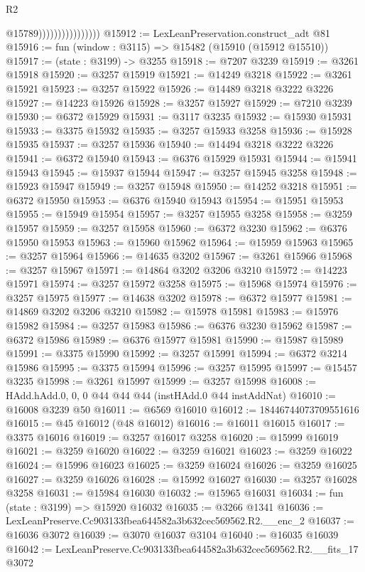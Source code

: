 \begin{lexlean}{R2}
\begin{coremodule}
                                    @15789))))))))))))))))
@15912 := LexLeanPreservation.construct_adt @81
@15916 := fun (window : @3115) => @15482 (@15910 (@15912 @15510))
@15917 := (state : @3199) -> @3255
@15918 := @7207 @3239
@15919 := @3261 @15918
@15920 := @3257 @15919
@15921 := @14249 @3218
@15922 := @3261 @15921
@15923 := @3257 @15922
@15926 := @14489 @3218 @3222 @3226
@15927 := @14223 @15926
@15928 := @3257 @15927
@15929 := @7210 @3239
@15930 := @6372 @15929
@15931 := @3117 @3235
@15932 := @15930 @15931
@15933 := @3375 @15932
@15935 := @3257 @15933 @3258
@15936 := @15928 @15935
@15937 := @3257 @15936
@15940 := @14494 @3218 @3222 @3226
@15941 := @6372 @15940
@15943 := @6376 @15929 @15931
@15944 := @15941 @15943
@15945 := @15937 @15944
@15947 := @3257 @15945 @3258
@15948 := @15923 @15947
@15949 := @3257 @15948
@15950 := @14252 @3218
@15951 := @6372 @15950
@15953 := @6376 @15940 @15943
@15954 := @15951 @15953
@15955 := @15949 @15954
@15957 := @3257 @15955 @3258
@15958 := @3259 @15957
@15959 := @3257 @15958
@15960 := @6372 @3230
@15962 := @6376 @15950 @15953
@15963 := @15960 @15962
@15964 := @15959 @15963
@15965 := @3257 @15964
@15966 := @14635 @3202
@15967 := @3261 @15966
@15968 := @3257 @15967
@15971 := @14864 @3202 @3206 @3210
@15972 := @14223 @15971
@15974 := @3257 @15972 @3258
@15975 := @15968 @15974
@15976 := @3257 @15975
@15977 := @14638 @3202
@15978 := @6372 @15977
@15981 := @14869 @3202 @3206 @3210
@15982 := @15978 @15981
@15983 := @15976 @15982
@15984 := @3257 @15983
@15986 := @6376 @3230 @15962
@15987 := @6372 @15986
@15989 := @6376 @15977 @15981
@15990 := @15987 @15989
@15991 := @3375 @15990
@15992 := @3257 @15991
@15994 := @6372 @3214 @15986
@15995 := @3375 @15994
@15996 := @3257 @15995
@15997 := @15457 @3235
@15998 := @3261 @15997
@15999 := @3257 @15998
@16008 := HAdd.hAdd.{0, 0, 0} @44 @44 @44 (instHAdd.{0} @44 instAddNat)
@16010 := @16008 @3239 @50
@16011 := @6569 @16010
@16012 := 18446744073709551616
@16015 := @45 @16012 (@48 @16012)
@16016 := @16011 @16015
@16017 := @3375 @16016
@16019 := @3257 @16017 @3258
@16020 := @15999 @16019
@16021 := @3259 @16020
@16022 := @3259 @16021
@16023 := @3259 @16022
@16024 := @15996 @16023
@16025 := @3259 @16024
@16026 := @3259 @16025
@16027 := @3259 @16026
@16028 := @15992 @16027
@16030 := @3257 @16028 @3258
@16031 := @15984 @16030
@16032 := @15965 @16031
@16034 := fun (state : @3199) => @15920 @16032
@16035 := @3266 @1341
@16036 := LexLeanPreserve.Cc903133fbea644582a3b632cec569562.R2.__enc_2
@16037 := @16036 @3072
@16039 := @3070 @16037 @3104
@16040 := @16035 @16039
@16042 := LexLeanPreserve.Cc903133fbea644582a3b632cec569562.R2.__fits_17 @3072

\end{coremodule}
\end{lexlean}
